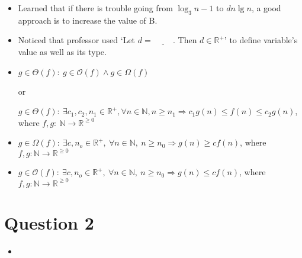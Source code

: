 \documentclass[12pt]{article}
\begin{document}
\bigskip

\begin{itemize}
    \item Learned that if there is trouble going from $\log_3n - 1$ to $dn\lg n$,
    a good approach is to increase the value of B.
    \item Noticed that professor used `Let $d = \underline{\hspace{1cm}}$. Then $d \in \mathbb{R}^+$'
    to define variable's value as well as its type.
    \item
    $g \in \Theta(f):\: g \in \mathcal{O}(f) \land g \in \Omega(f)$

    or

    $g \in \Theta(f):\:\exists c_1,c_2,n_1 \in \mathbb{R}^{+}, \forall n \in \mathbb{N}, n \geq n_1
    \Rightarrow c_1g(n) \leq f(n) \leq c_2g(n)$, where $f,g:\:\mathbb{N} \to \mathbb{R}^{\geq 0}$

    \item
    $g \in \Omega(f):\:\exists c,n_o \in \mathbb{R}^{+},\:\forall n \in
    \mathbb{N},\:n \geq n_0 \Rightarrow g(n) \geq cf(n)$, where $f,g:\mathbb{N} \to \mathbb{R}^{\geq 0}$

    \item

    $g \in \mathcal{O}(f):\:\exists c,n_o \in \mathbb{R}^{+},\:\forall n \in
    \mathbb{N},\:n \geq n_0 \Rightarrow g(n) \leq cf(n)$, where $f,g:\mathbb{N} \to \mathbb{R}^{\geq 0}$
\end{itemize}

\bigskip

\section*{Question 2}

\begin{itemize}
    \item

\end{itemize}

\bigskip
\end{document}
